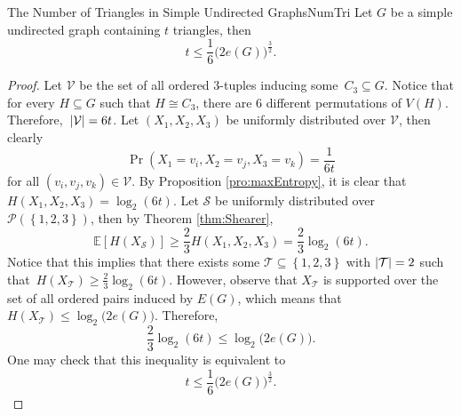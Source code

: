 \documentclass[math, code]{amznotes}
\theoremstyle{remark}
\begin{document}
\begin{probox}{The Number of Triangles in Simple Undirected Graphs}{NumTri}
    Let $G$ be a simple undirected graph containing $t$ triangles, then 
    \begin{equation*}
        t \leq \frac{1}{6}\bigl(2e\left(G\right)\bigr)^{\frac{3}{2}}.
    \end{equation*}
    \tcblower
    \begin{proof}
        Let $\mathcal{V}$ be the set of all ordered $3$-tuples inducing some~$C_3 \subseteq G$. Notice that for every $H \subseteq G$ such that $H \cong C_3$, there are $6$ different permutations of $V\left(H\right)$. Therefore,~${\left\lvert {\mathcal{V}} \right\rvert} = 6t$. Let $\left(X_1, X_2, X_3\right)$ be uniformly distributed over $\mathcal{V}$, then clearly 
        \begin{equation*}
            \Pr\left(X_1 = v_i, X_2 = v_j, X_3 = v_k\right) = \frac{1}{6t}
        \end{equation*}
        for all $\left(v_i, v_j, v_k\right) \in \mathcal{V}$. By Proposition \ref{pro:maxEntropy}, it is clear that $H\left(X_1, X_2, X_3\right) = \log_2\left(6t\right)$. Let $\mathcal{S}$ be uniformly distributed over $\mathcal{P}\left(\left\{1, 2, 3\right\}\right)$, then by Theorem \ref{thm:Shearer}, 
        \begin{equation*}
            \mathbb{E}\left[H\left(X_{\mathcal{S}}\right)\right] \geq \frac{2}{3}H\left(X_1, X_2, X_3\right) = \frac{2}{3}\log_2\left(6t\right).
        \end{equation*}
        Notice that this implies that there exists some $\mathcal{T} \subseteq \left\{1, 2, 3\right\}$ with ${\left\lvert {\mathcal{T}} \right\rvert} = 2$ such that~$H\left(X_{\mathcal{T}}\right) \geq \frac{2}{3}\log_2\left(6t\right)$. However, observe that $X_{\mathcal{T}}$ is supported over the set of all ordered pairs induced by $E\left(G\right)$, which means that $H\left(X_{\mathcal{T}}\right) \leq \log_2\bigl(2e\left(G\right)\bigr)$. Therefore, 
        \begin{equation*}
            \frac{2}{3}\log_2\left(6t\right) \leq \log_2\bigl(2e\left(G\right)\bigr).
        \end{equation*}
        One may check that this inequality is equivalent to 
        \begin{equation*}
            t \leq \frac{1}{6}\bigl(2e\left(G\right)\bigr)^{\frac{3}{2}}.
        \end{equation*}
    \end{proof}
\end{probox}
\end{document}
